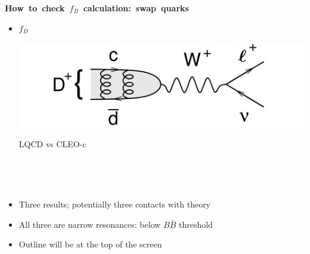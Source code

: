 \documentclass[landscape]{article}
\newenvironment{slide}[1][ ]{\mbox{\bf \boldmath #1 } \vfill}{\vfill \vspace{-1.5 cm} \mbox{ } \pagebreak}
\newenvironment{itemizer}[1]{\begin{itemize}\setlength{\itemsep}{#1}}{\end{itemize}}
\begin{document}
\begin{slide}[How to check $f_B$ calculation: swap quarks]
\begin{itemizer}{2 cm}
  \item \begin{minipage}{0.22\linewidth} $f_D$ \end{minipage} \hfill \begin{minipage}{11 cm} \includegraphics[width=\linewidth]{diagram_Dtolnu} \end{minipage} \hfill \begin{minipage}{0.3\linewidth} \begin{center} LQCD vs CLEO-c \end{center} \end{minipage}

\end{itemizer}

\vfill

\end{slide}

\begin{slide}

\vfill
\begin{center}
\end{center}

\vfill
\begin{itemizer}{1 cm}

  \item Three results; potentially three contacts with theory

  \item All three are narrow resonances: below $B\bar{B}$ threshold

  \item Outline will be at the top of the screen

\end{itemizer}

\vfill

\end{slide}
\end{document}

